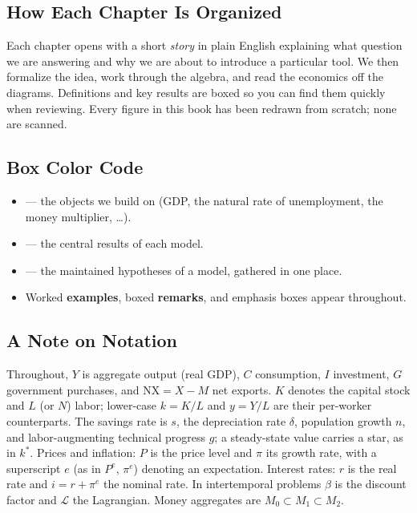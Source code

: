 \documentclass[oneside]{book}
\begin{document}
\subsection*{How Each Chapter Is Organized}

Each chapter opens with a short \emph{story} in plain English explaining what question we are answering and why we are about to introduce a particular tool. We then formalize the idea, work through the algebra, and read the economics off the diagrams. Definitions and key results are boxed so you can find them quickly when reviewing. Every figure in this book has been redrawn from scratch; none are scanned.

\subsection*{Box Color Code}

\begin{itemize}
    \item {} --- the objects we build on (GDP, the natural rate of unemployment, the money multiplier, \dots).
    \item {} --- the central results of each model.
    \item {} --- the maintained hypotheses of a model, gathered in one place.
    \item Worked \textbf{examples}, boxed \textbf{remarks}, and emphasis boxes appear throughout.
\end{itemize}

\subsection*{A Note on Notation}

Throughout, $Y$ is aggregate output (real GDP), $C$ consumption, $I$ investment, $G$ government purchases, and $\mathrm{NX}=X-M$ net exports. $K$ denotes the capital stock and $L$ (or $N$) labor; lower-case $k=K/L$ and $y=Y/L$ are their per-worker counterparts. The savings rate is $s$, the depreciation rate $\delta$, population growth $n$, and labor-augmenting technical progress $g$; a steady-state value carries a star, as in $k^{*}$. Prices and inflation: $P$ is the price level and $\pi$ its growth rate, with a superscript $e$ (as in $P^{e}$, $\pi^{e}$) denoting an expectation. Interest rates: $r$ is the real rate and $i=r+\pi^{e}$ the nominal rate. In intertemporal problems $\beta$ is the discount factor and $\mathcal{L}$ the Lagrangian. Money aggregates are $M_0\subset M_1\subset M_2$.
\end{document}
